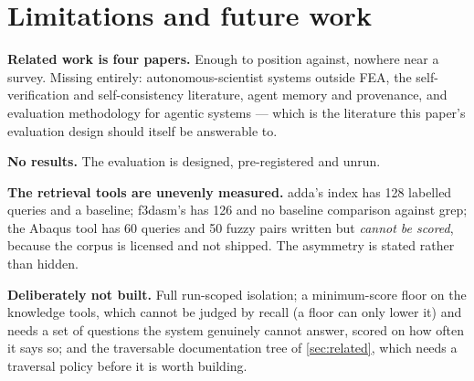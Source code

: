 \section{Limitations and future work}
\label{sec:limitations}

\textbf{Related work is four papers.} Enough to position against, nowhere near
a survey. Missing entirely: autonomous-scientist systems outside FEA, the
self-verification and self-consistency literature, agent memory and provenance,
and evaluation methodology for agentic systems --- which is the literature this
paper's evaluation design should itself be answerable to.

\textbf{No results.} The evaluation is designed, pre-registered and unrun.

\textbf{The retrieval tools are unevenly measured.} adda's index has 128
labelled queries and a baseline; f3dasm's has 126 and no baseline comparison
against grep; the Abaqus tool has 60 queries and 50 fuzzy pairs written but
\emph{cannot be scored}, because the corpus is licensed and not shipped. The
asymmetry is stated rather than hidden.

\textbf{Deliberately not built.} Full run-scoped isolation; a minimum-score
floor on the knowledge tools, which cannot be judged by recall (a floor can
only lower it) and needs a set of questions the system genuinely cannot answer,
scored on how often it says so; and the traversable documentation tree of
\cref{sec:related}, which needs a traversal policy before it is worth building.
